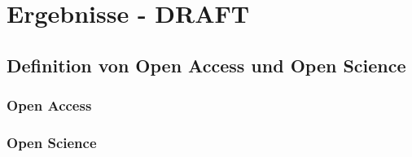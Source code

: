 \chapter{Ergebnisse - DRAFT}

\section{Definition von Open Access und Open Science}
\subsection{Open Access}
\subsection{Open Science}